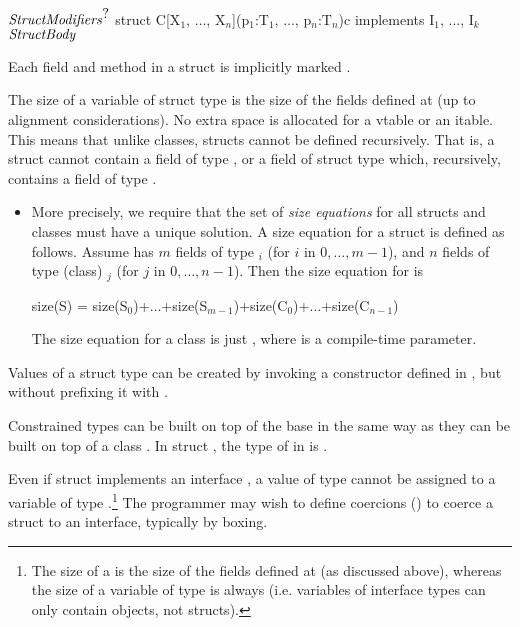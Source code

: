 \begin{xtenmath}
$\mbox{\emph{StructModifiers}}^{\mbox{?}}$
struct C[X$_1$, $\ldots$, X$_n$](p$_1$:T$_1$, $\ldots$, p$_n$:T$_n$){c} 
   implements I$_1$, $\ldots$, I$_k$ {
$\mbox{\emph{StructBody}}$
}
\end{xtenmath}

Each field and method in a struct is implicitly marked .  

The size of a variable of struct type  is the size of the fields
defined at  (up to alignment considerations). No extra space is
allocated for a vtable or an itable. This means that unlike classes,
structs cannot be defined recursively. That is, a struct  cannot
contain a field of type , or a field of struct type  which,
recursively, contains a field of type .

\begin{itemize}
\item More precisely, we require that the set of \emph{size equations}
  for all structs and classes must have a unique solution. A size
  equation for a struct  is defined as follows. Assume  has $m$ fields
  of type $_i$ (for $i$ in $0,\ldots,m-1$), and $n$ fields of type (class) $_j$
  (for $j$ in $0,\ldots,n-1$). Then the size equation for  is 
\begin{xtenmath}
size(S) = size(S$_0$)+$\ldots$+size(S$_{m-1}$)+size(C$_0$)+$\ldots$+size(C$_{n-1}$) 
\end{xtenmath}
The size
equation for a class  is just , where
 is a compile-time parameter.
\end{itemize}

Values of a struct  type can be created by invoking a constructor
defined in , but without prefixing it with .

Constrained types can be built on top of the base  in the same way as
they can be built on top of a class . In struct ,
the type of  in  is .


Even if struct  implements an interface , a value of
type  cannot be assigned to a variable of type
.\footnote{ The size of a  is the size of the fields
  defined at  (as discussed above), whereas the size of a
  variable of type  is always  (i.e.{}
  variables of interface types can only contain objects, not structs).
} The programmer may wish to define coercions
() to coerce a struct to an interface,
typically by boxing.

